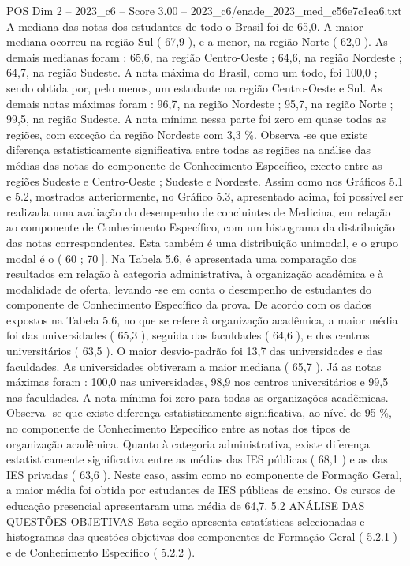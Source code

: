 \begin{textsample}{POS Dim 2 – 2023\_c6 – Score 3.00 – 2023\_c6/enade\_2023\_med\_c56e7c1ea6.txt}
A mediana das notas dos estudantes de todo o Brasil foi de 65,0.
A maior mediana ocorreu na região Sul ( 67,9 ), e a menor, na região Norte ( 62,0 ).
As demais medianas foram : 65,6, na região Centro-Oeste ; 64,6, na região Nordeste ; 64,7, na região Sudeste.
A nota máxima do Brasil, como um todo, foi 100,0 ; sendo obtida por, pelo menos, um estudante na região Centro-Oeste e Sul.
As demais notas máximas foram : 96,7, na região Nordeste ; 95,7, na região Norte ; 99,5, na região Sudeste.
A nota mínima nessa parte foi zero em quase todas as regiões, com exceção da região Nordeste com 3,3 \%.
Observa -se que existe diferença estatisticamente significativa entre todas as regiões na análise das médias das notas do componente de Conhecimento Específico, exceto entre as regiões Sudeste e Centro-Oeste ; Sudeste e Nordeste.
Assim como nos Gráficos 5.1 e 5.2, mostrados anteriormente, no Gráfico 5.3, apresentado acima, foi possível ser realizada uma avaliação do desempenho de concluintes de Medicina, em relação ao componente de Conhecimento Específico, com um histograma da distribuição das notas correspondentes.
Esta também é uma distribuição unimodal, e o grupo modal é o ( 60 ; 70 ].
Na Tabela 5.6, é apresentada uma comparação dos resultados em relação à categoria administrativa, à organização acadêmica e à modalidade de oferta, levando -se em conta o desempenho de estudantes do componente de Conhecimento Específico da prova.
De acordo com os dados expostos na Tabela 5.6, no que se refere à organização acadêmica, a maior média foi das universidades ( 65,3 ), seguida das faculdades ( 64,6 ), e dos centros universitários ( 63,5 ).
O maior desvio-padrão foi 13,7 das universidades e das faculdades.
As universidades obtiveram a maior mediana ( 65,7 ).
Já as notas máximas foram : 100,0 nas universidades, 98,9 nos centros universitários e 99,5 nas faculdades.
A nota mínima foi zero para todas as organizações acadêmicas.
Observa -se que existe diferença estatisticamente significativa, ao nível de 95 \%, no componente de Conhecimento Específico entre as notas dos tipos de organização acadêmica.
Quanto à categoria administrativa, existe diferença estatisticamente significativa entre as médias das IES públicas ( 68,1 ) e as das IES privadas ( 63,6 ).
Neste caso, assim como no componente de Formação Geral, a maior média foi obtida por estudantes de IES públicas de ensino.
Os cursos de educação presencial apresentaram uma média de 64,7. 5.2 ANÁLISE DAS QUESTÕES OBJETIVAS Esta seção apresenta estatísticas selecionadas e histogramas das questões objetivas dos componentes de Formação Geral ( 5.2.1 ) e de Conhecimento Específico ( 5.2.2 ).

\end{textsample}
